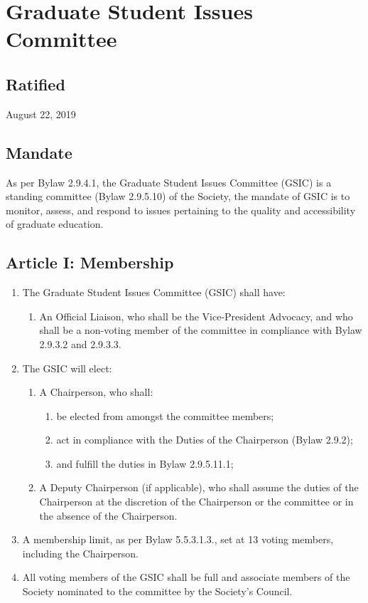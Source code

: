 \section{Graduate Student Issues Committee}

\subsection{Ratified}
August 22, 2019

\subsection{Mandate}
As per Bylaw 2.9.4.1, the Graduate Student Issues Committee (GSIC) is a standing committee (Bylaw 2.9.5.10) of the Society, the mandate of GSIC is to monitor, assess, and respond to issues pertaining to the quality and accessibility of graduate education.

\subsection{Article I: Membership}
\begin{enumerate}[label*=\arabic*., align=left]	
\item The Graduate Student Issues Committee (GSIC) shall have:
\begin{enumerate}[label*=\arabic*., align=left]	
\item An Official Liaison, who shall be the Vice-President Advocacy, and who shall be a non-voting member of the committee in compliance with Bylaw 2.9.3.2 and 2.9.3.3.
\end{enumerate}
\item The GSIC will elect:
\begin{enumerate}[label*=\arabic*., align=left]
\item A Chairperson, who shall:
\begin{enumerate}[label*=\arabic*., align=left]
\item be elected from amongst the committee members;
\item act in compliance with the Duties of the Chairperson (Bylaw 2.9.2);
\item and fulfill the duties in Bylaw 2.9.5.11.1;
\end{enumerate}
\item A Deputy Chairperson (if applicable), who shall assume the duties of the Chairperson at the discretion of the Chairperson or the committee or in the absence of the Chairperson.
\end{enumerate}
\item A membership limit, as per Bylaw 5.5.3.1.3., set at 13 voting members, including the Chairperson.
\item All voting members of the GSIC shall be full and associate members of the Society nominated to the committee by the Society’s Council.
\end{enumerate}

